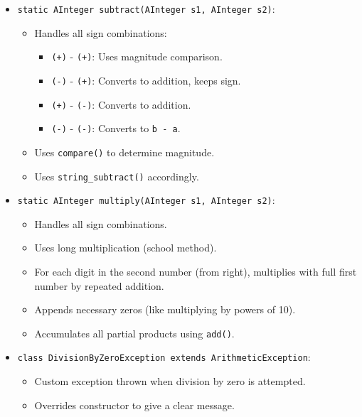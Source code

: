 \documentclass{article}
\begin{document}
\begin{itemize}
    \item \texttt{static AInteger subtract(AInteger s1, AInteger s2)}:
    \begin{itemize}
        \item Handles all sign combinations:
        \begin{itemize}
            \item \texttt{(+)} - \texttt{(+)}: Uses magnitude comparison.
            \item \texttt{(-)} - \texttt{(+)}: Converts to addition, keeps sign.
            \item \texttt{(+)} - \texttt{(-)}: Converts to addition.
            \item \texttt{(-)} - \texttt{(-)}: Converts to \texttt{b - a}.
        \end{itemize}
        \item Uses \texttt{compare()} to determine magnitude.
        \item Uses \texttt{string\_subtract()} accordingly.
    \end{itemize}
\end{itemize}


\begin{itemize}
    \item \texttt{static AInteger multiply(AInteger s1, AInteger s2)}:
    \begin{itemize}
        \item Handles all sign combinations.
        \item Uses long multiplication (school method).
        \item For each digit in the second number (from right), multiplies with full first number by repeated addition.
        \item Appends necessary zeros (like multiplying by powers of 10).
        \item Accumulates all partial products using \texttt{add()}.
    \end{itemize}
\end{itemize}


\begin{itemize}
    \item \texttt{class DivisionByZeroException extends ArithmeticException}:
    \begin{itemize}
        \item Custom exception thrown when division by zero is attempted.
        \item Overrides constructor to give a clear message.
    \end{itemize}
\end{itemize}
\end{document}
